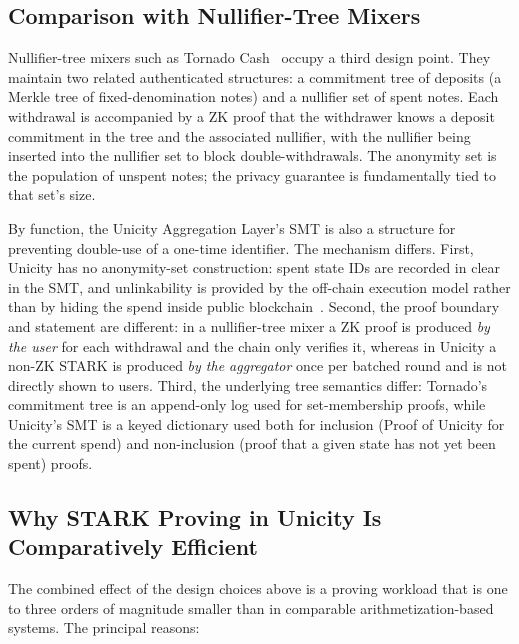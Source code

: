 \documentclass[11pt]{article}
\begin{document}
\subsection{Comparison with Nullifier-Tree Mixers}

Nullifier-tree mixers such as Tornado Cash~\cite{tornado} occupy a third design point. They maintain two related authenticated structures: a commitment tree of deposits (a Merkle tree of fixed-denomination notes) and a nullifier set of spent notes. Each withdrawal is accompanied by a ZK proof that the withdrawer knows a deposit commitment in the tree and the associated nullifier, with the nullifier being inserted into the nullifier set to block double-withdrawals. The anonymity set is the population of unspent notes; the privacy guarantee is fundamentally tied to that set's size.

By function, the Unicity Aggregation Layer's SMT is also a structure for preventing double-use of a one-time identifier. The mechanism differs. First, Unicity has no anonymity-set construction: spent state IDs are recorded in clear in the SMT, and unlinkability is provided by the off-chain execution model rather than by hiding the spend inside public blockchain~\cite{exemodel}. Second, the proof boundary and statement are different: in a nullifier-tree mixer a ZK proof is produced \emph{by the user} for each withdrawal and the chain only verifies it, whereas in Unicity a non-ZK STARK is produced \emph{by the aggregator} once per batched round and is not directly shown to users. Third, the underlying tree semantics differ: Tornado's commitment tree is an append-only log used for set-membership proofs, while Unicity's SMT is a keyed dictionary used both for inclusion (Proof of Unicity for the current spend) and non-inclusion (proof that a given state has not yet been spent) proofs.

\subsection{Why STARK Proving in Unicity Is Comparatively Efficient}

The combined effect of the design choices above is a proving workload that is one to three orders of magnitude smaller than in comparable arithmetization-based systems. The principal reasons:
\end{document}
